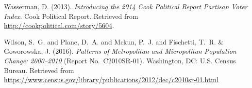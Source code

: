 \documentclass[draft,linenumbers]{agujournal}\usepackage{knitr}
\begin{document}
\begin{thebibliography}{33}
  Wasserman, D. (2013).
  \textit{Introducing the 2014 {C}ook {P}olitical {R}eport {P}artisan {V}oter
  {I}ndex}.
  Cook Political Report.
  Retrieved from
  \url{http://cookpolitical.com/story/5604}.

  Wilson, S.~G. and Plane, D.~A. and Mckun, P.~J. and Fischetti, T.~R. \&
  Goworowska, J. (2016).
  \textit{Patterns of Metropolitan and Micropolitan Population Change: 2000--2010\/}
  (Report No.~C2010SR-01).
  Washington, DC:  U.S. Census Bureau.
  Retrieved from
  \url{https://www.census.gov/library/publications/2012/dec/c2010sr-01.html}

\end{thebibliography}

%
%





%
%










\listofchanges
\end{document}
